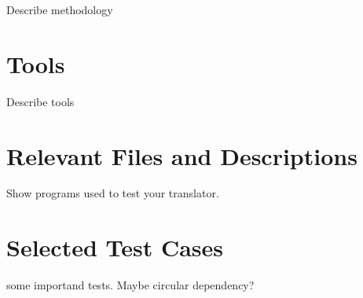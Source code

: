 Describe methodology
\section{Tools}
Describe tools
\section{Relevant Files and Descriptions}
Show programs used to test your translator.
\section{Selected  Test Cases}
some importand tests. Maybe circular dependency?
